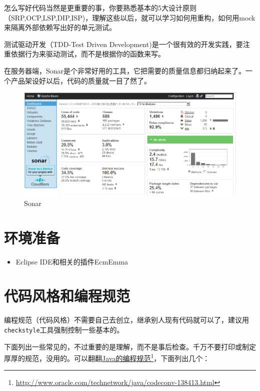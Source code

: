 怎么写好代码当然是更重要的事，你要熟悉基本的5大设计原则（SRP,OCP,LSP,DIP,ISP)，理解这些以后，就可以学习如何用重构，如何用mock来隔离外部依赖写出好的单元测试。

测试驱动开发（TDD-Test Driven Development)是一个很有效的开发实践，要注重依据行为来驱动测试，而不是根据你的函数来写。

在服务器端，Sonar是个非常好用的工具，它把需要的质量信息都归纳起来了。一个产品架设好以后，代码的质量就一目了然了。

\begin{figure}[htbp]
\centering
\includegraphics[keepaspectratio,width=\textwidth,height=0.75\textheight]{img/18333fig0401-tn.png}
\caption{Sonar}
\end{figure}

\section{环境准备}
\label{环境准备}

\begin{itemize}
\item Eclipse IDE和相关的插件EcmEmma

\end{itemize}

\section{代码风格和编程规范}
\label{代码风格和编程规范}

编程规范（代码风格）不需要自己去创立，继承别人现有代码就可以了，建议用\texttt{checkstyle}工具强制控制一些基本的。

下面列出一些常见的，不过重要的是理解，而不是事后检查。千万不要打印或制定厚厚的规范，没用的。可以翻翻\href{http://www.oracle.com/technetwork/java/codeconv-138413.html}{Java的编程规范}\footnote{\href{http://www.oracle.com/technetwork/java/codeconv-138413.html}{http:/\slash www.oracle.com\slash technetwork\slash java\slash codeconv-138413.html}}，下面列出几个：

